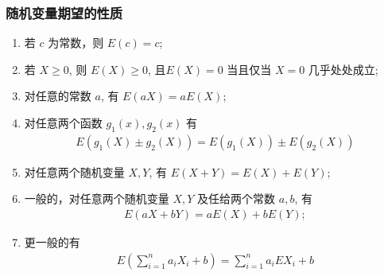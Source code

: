 \documentclass[Prob-All.tex]{subfiles}
\begin{document}
	\begin{frame}
		\frametitle{随机变量期望的性质}
		\begin{enumerate}[<+-|alert@+>]
			\item 若 $c$ 为常数，则 $E (c)=c$;
			\item 若 $X\ge 0$, 则 $E (X)\ge 0$, 且$E(X)=0$ 当且仅当 $X=0$ 几乎处处成立;
			\item 对任意的常数 $a$, 有 $E (aX)=aE (X)$;
			\item 对任意两个函数 $g_1 (x),g_2 (x)$ 有
			\begin{eqnarray*}
				E(g_1(X)\pm g_2(X))=E(g_1(X))\pm E(g_2(X))
			\end{eqnarray*}
			\item 对任意两个随机变量 $X,Y$, 有 $E (X+Y)=E (X)+E (Y)$;
			\item 一般的，对任意两个随机变量 $X,Y$ 及任给两个常数 $a,b$, 有
			\begin{eqnarray*}
				E(aX+bY)=aE(X)+bE(Y);
			\end{eqnarray*}
			\item 更一般的有
			\begin{eqnarray*}
				E(\sum_{i=1}^na_iX_i+b)=\sum_{i=1}^na_iEX_i+b
			\end{eqnarray*}



		\end{enumerate}
	\end{frame}
\end{document}
